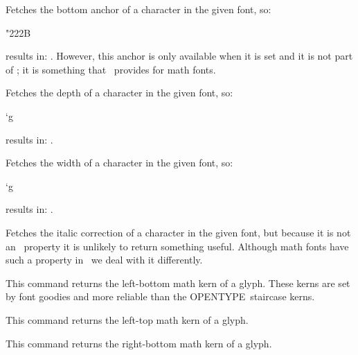 \stopoldprimitive

\startnewprimitive[title={\prm {fontcharba}}]

Fetches the bottom anchor of a character in the given font, so:

\startbuffer
\the\fontcharba{} "222B
\stopbuffer

results in: \inlinebuffer. However, this anchor is only available when it is set
and it is not part of \OPENTYPE; it is something that \CONTEXT\ provides for math
fonts.

\stopnewprimitive

\startoldprimitive[title={\prm {fontchardp}}]

Fetches the depth of a character in the given font, so:

\startbuffer
\the\fontchardp\font`g
\stopbuffer

results in: \inlinebuffer.

\stopoldprimitive

\startoldprimitive[title={\prm {fontcharht}}]

Fetches the width of a character in the given font, so:

\startbuffer
\the\fontcharht\font`g
\stopbuffer

results in: \inlinebuffer.

\stopoldprimitive

\startoldprimitive[title={\prm {fontcharic}}]

Fetches the italic correction of a character in the given font, but because it is
not an \OPENTYPE\ property it is unlikely to return something useful. Although
math fonts have such a property in \CONTEXT\ we deal with it differently.

\stopoldprimitive

\startnewprimitive[title={\prm {fontcharlb}}]

This command returns the left-bottom math kern of a glyph. These kerns are set
by \CONTEXT font goodies and more reliable than the OPENTYPE\ staircase kerns.

\stopnewprimitive

\startnewprimitive[title={\prm {fontcharlt}}]

This command returns the left-top math kern of a glyph.

\stopnewprimitive

\startnewprimitive[title={\prm {fontcharrb}}]

This command returns the right-bottom math kern of a glyph.

